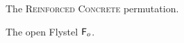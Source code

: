 \documentclass{article}
\begin{document}
\begin{figure}[ht]
  \centering
  \resizebox{\linewidth}{!}{}
  \caption{The \textsc{Reinforced Concrete} permutation.}
  \label{fig:poseidon}
\end{figure}

\begin{figure}[ht]
  \centering
  \resizebox{0.6\linewidth}{!}{}
  \caption{The open Flystel $\mathsf{F}_o$.}
  \label{fig:flystel-open}
\end{figure}
\end{document}
